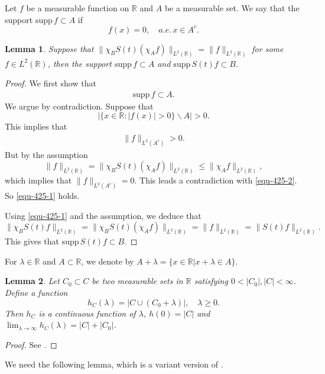\documentclass[preprint,12pt]{elsarticle}
\def\R {\mathbb{R}}
\newtheorem{lemma}{Lemma}[section]
\begin{document}
Let $f$ be a measurable function on $\R$ and $A$ be a measurable set. We say that the support $\mathrm{supp } \, f\subset A$ if
$$
f(x)=0, \quad a.e. \, x\in A^c.
$$

\begin{lemma}\label{lem-2}
Suppose that $\|\chi_BS(t)(\chi_Af)\|_{L^2(\R)}=\|f\|_{L^2(\R)}$ for some $f\in L^2(\R)$, then the support $\mathrm{supp } \, f\subset A$
and $\mathrm{supp } \, S(t)f \subset B$.
\end{lemma}
\begin{proof}
We first show that
\begin{align}\label{equ-425-1}
\mathrm{supp }  \, f\subset A.
\end{align}
We argue by contradiction. Suppose that
$$
\Big|\{x\in \R: |f(x)|>0\} \backslash A \Big|>0.
$$
This implies that
\begin{align}\label{equ-425-2}
\|f\|_{L^2(A^c)}>0.
\end{align}
But by the assumption
$$
\|f\|_{L^2(\R)}=\|\chi_BS(t)(\chi_Af)\|_{L^2(\R)}\leq \|\chi_Af\|_{L^2(\R)},
$$
which implies that $\|f\|_{L^2(A^c)}=0$. This leads a contradiction with \eqref{equ-425-2}. So \eqref{equ-425-1} holds.

Using \eqref{equ-425-1} and the assumption, we deduce that
$$
\|\chi_BS(t)f\|_{L^2(\R)}=\|\chi_BS(t)(\chi_Af)\|_{L^2(\R)}=\|f\|_{L^2(\R)}=\|S(t)f\|_{L^2(\R)}.
$$
This gives that $\mathrm{supp } \, S(t)f \subset B$.
\end{proof}

For $\lambda\in \R$ and $A\subset\mathbb{R}$, we denote by $A+\lambda=\{x\in \mathbb{R}\lvert x+\lambda \in A\}$.
\begin{lemma}\label{lem-3}
Let $C_0\subset C$ be two measurable sets in $\R$ satisfying $0<|C_0|,|C|<\infty$. Define a function
$$
h_C(\lambda)=|C\cup (C_0+\lambda)|, \quad \lambda\geq 0.
$$
Then $h_C$ is a continuous function of $\lambda$, $h(0)=|C|$ and $\lim_{\lambda\to \infty}\limits h_C(\lambda)=|C|+|C_0|$.
\end{lemma}
\begin{proof}
See \cite[p.99]{Havin}.
\end{proof}

We need the following lemma, which is a variant version of \cite[Lemma 1]{Amrein}.
\end{document}
